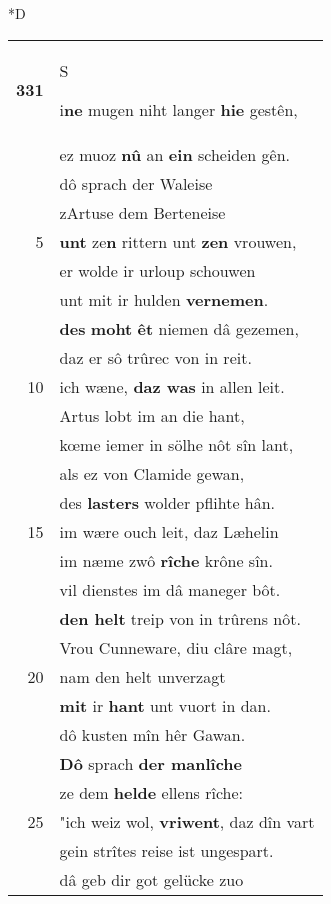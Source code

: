 \documentclass[8pt,a4paper,notitlepage]{article}
\begin{document}
\begin{table}[ht]
\begin{minipage}[t]{0.5\linewidth}
\small
\begin{center}*D
\end{center}
\begin{tabular}{rl}
\textbf{331} & \begin{large}S\end{large}i\textbf{ne} mugen niht langer \textbf{hie} gestên,\\ 
 & ez muoz \textbf{nû} an \textbf{ein} scheiden gên.\\ 
 & dô sprach der Waleise\\ 
 & zArtuse dem Berteneise\\ 
5 & \textbf{unt} ze\textbf{n} rittern unt \textbf{zen} vrouwen,\\ 
 & er wolde ir urloup schouwen\\ 
 & unt mit ir hulden \textbf{vernemen}.\\ 
 & \textbf{des} \textbf{moht} \textbf{êt} niemen dâ gezemen,\\ 
 & daz er sô trûrec von in reit.\\ 
10 & ich wæne, \textbf{daz was} in allen leit.\\ 
 & Artus lobt im an die hant,\\ 
 & kœme iemer in sölhe nôt sîn lant,\\ 
 & als ez von Clamide gewan,\\ 
 & des \textbf{lasters} wolder pflihte hân.\\ 
15 & im wære ouch leit, daz Læhelin\\ 
 & im næme zwô \textbf{rîche} krône sîn.\\ 
 & vil dienstes im dâ maneger bôt.\\ 
 & \textbf{den helt} treip von in trûrens nôt.\\ 
 & Vrou Cunneware, diu clâre magt,\\ 
20 & nam den helt unverzagt\\ 
 & \textbf{mit} ir \textbf{hant} unt vuort in dan.\\ 
 & dô kusten mîn hêr Gawan.\\ 
 & \textbf{Dô} sprach \textbf{der manlîche}\\ 
 & ze dem \textbf{helde} ellens rîche:\\ 
25 & "ich weiz wol, \textbf{vriwent}, daz dîn vart\\ 
 & gein strîtes reise ist ungespart.\\ 
 & dâ geb dir got gelücke zuo\\ 

\end{tabular}
\end{minipage}
\end{table}
\end{document}
